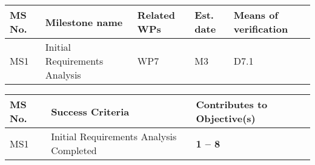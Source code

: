 \documentclass[a4paper,11pt]{article}
\begin{document}
\bigskip

\renewcommand{\thems}{MS\arabic{ms}}
\begin{minipage}{\textwidth}
\begin{center}
 \begin{tabular*}{\textwidth}{|p{1.5cm}|p{8.3cm}|p{1.2cm}|p{0.6cm}|p{4.2cm}|}  \hline
 \textbf{MS No.} & \textbf{Milestone name} & \textbf{Related WPs} & \textbf{Est. date} & \textbf{Means of
   verification} \\ %
\hline
MS1 & Initial Requirements Analysis & WP7 & M3 & D7.1 \\
   \hline
\end{tabular*}
\end{center}
\end{minipage}

\setcounter{ms}{0}
\vspace{20pt}
\begin{center}
\begin{tabular*}{\textwidth}{|p{1.2cm}|p{13.3cm}|p{2.2cm}|}\hline
\textbf{MS No.} & \textbf{Success Criteria} & \textbf{Contributes to
  Objective(s)} \\
  \hline
MS1 & Initial Requirements Analysis Completed & \textbf{1 -- 8} \\
  \hline
\end{tabular*}
\end{center}

\newpage
{}
\label{sect:deliverables}
\end{document}
